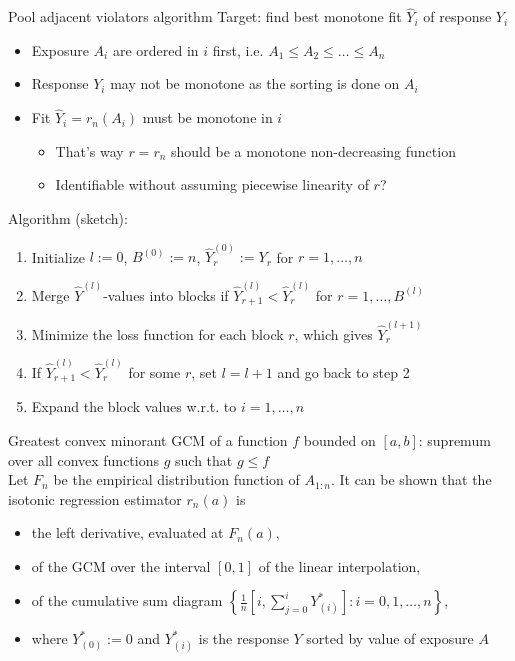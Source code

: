 \documentclass{beamer}
\newcommand{\f}[2]{\frac{#1}{#2}}
\newcommand{\vs}[1]{\vspace{#1 cm}}
\begin{document}
\begin{frame}{Pool adjacent violators algorithm}
  Target: find best monotone fit $\hat{Y}_i$ of response $Y_i$
  \begin{itemize}
    \item Exposure $A_i$ are ordered in $i$ first, i.e. $A_1 \le A_2 \le \dots \le A_n$
    \item Response $Y_i$ may not be monotone as the sorting is done on $A_i$
    \item Fit $\hat{Y}_i = r_n(A_i)$ must be monotone in $i$
    \begin{itemize}
      \item That's way $r=r_n$ should be a monotone non-decreasing function
      \item Identifiable without assuming piecewise linearity of $r$?
    \end{itemize}
  \end{itemize}
  Algorithm (sketch):
  \begin{enumerate}
    \item Initialize $l:=0$, $B^{(0)}:=n$, $\hat{Y}_r^{(0)} := Y_r$ for $r=1, \dots, n$
    \item Merge $\hat{Y}^{(l)}$-values into blocks if $\hat{Y}_{r+1}^{(l)} < \hat{Y}_r^{(l)}$ for $r=1, \dots, B^{(l)}$
    \item Minimize the loss function for each block $r$, which gives $\hat{Y}_r^{(l+1)}$
    \item If $\hat{Y}_{r+1}^{(l)} < \hat{Y}_r^{(l)}$ for some $r$, set $l = l+1$ and go back to step 2
    \item Expand the block values w.r.t. to $i=1, \dots, n$
  \end{enumerate}
\end{frame}

\begin{frame}{Greatest convex minorant}
  GCM of a function $f$ bounded on $[a,b]$: supremum over all convex functions $g$ such that $g \le f$ \\
  \vs{0.5}
  Let $F_n$ be the empirical distribution function of $A_{1:n}$. It can be shown that the isotonic regression estimator $r_n(a)$ is
  \begin{itemize}
    \item the left derivative, evaluated at $F_n(a)$,
    \item of the GCM over the interval $[0,1]$ of the linear interpolation,
    \item of the cumulative sum diagram $\left\{ \f{1}{n} \left[ i, \sum_{j=0}^i Y_{(i)}^* \right]: i=0,1,\dots,n \right\}$,
    \item where $Y_{(0)}^* := 0$ and $Y_{(i)}^*$ is the response $Y$ sorted by value of exposure $A$
  \end{itemize}
\end{frame}
\end{document}
